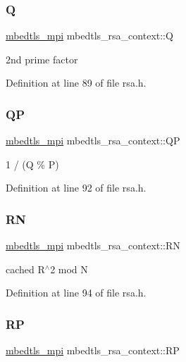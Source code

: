 \subsubsection{\texorpdfstring{Q}{Q}}
{\footnotesize\ttfamily \mbox{\hyperlink{structmbedtls__mpi}{mbedtls\+\_\+mpi}} mbedtls\+\_\+rsa\+\_\+context\+::Q}

2nd prime factor 

Definition at line 89 of file rsa.\+h.

\mbox{\label{structmbedtls__rsa__context_a76dad2612cdce4bc90933d317d3adc92}} 
\subsubsection{\texorpdfstring{QP}{QP}}
{\footnotesize\ttfamily \mbox{\hyperlink{structmbedtls__mpi}{mbedtls\+\_\+mpi}} mbedtls\+\_\+rsa\+\_\+context\+::\+QP}

1 / (Q \% P) 

Definition at line 92 of file rsa.\+h.

\mbox{\label{structmbedtls__rsa__context_a6e8530ea71b28336cbebd77219757271}} 
\subsubsection{\texorpdfstring{RN}{RN}}
{\footnotesize\ttfamily \mbox{\hyperlink{structmbedtls__mpi}{mbedtls\+\_\+mpi}} mbedtls\+\_\+rsa\+\_\+context\+::\+RN}

cached R$^\wedge$2 mod N 

Definition at line 94 of file rsa.\+h.

\mbox{\label{structmbedtls__rsa__context_a97215f3f5482cfb4887d00d47f030610}} 
\subsubsection{\texorpdfstring{RP}{RP}}
{\footnotesize\ttfamily \mbox{\hyperlink{structmbedtls__mpi}{mbedtls\+\_\+mpi}} mbedtls\+\_\+rsa\+\_\+context\+::\+RP}

